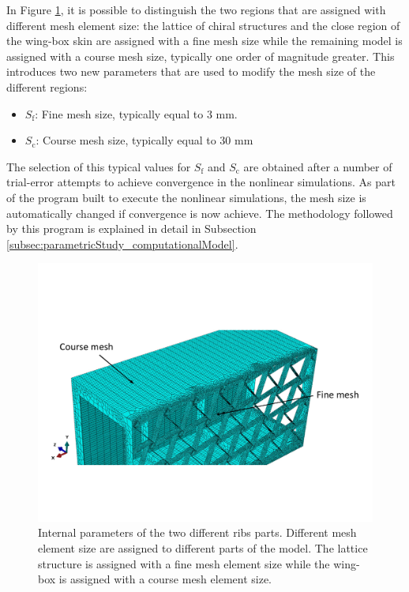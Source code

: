    In Figure \ref{fig:mesh}, it is possible to distinguish the two regions that are assigned with different mesh element size: the lattice of chiral structures and the close region of the wing-box skin are assigned with a fine mesh size while the remaining model is assigned with a course mesh size, typically one order of magnitude greater. This introduces two new parameters that are used to modify the mesh size of the different regions:
    \begin{itemize}
      \item $S_{\mathrm{f}}$: Fine mesh size, typically equal to 3 mm.
      \item $S_{\mathrm{c}}$: Course mesh size, typically equal to 30 mm
    \end{itemize}

    The selection of this typical values for $S_{\mathrm{f}}$ and $S_{\mathrm{c}}$ are obtained after a number of trial-error attempts to achieve convergence in the nonlinear simulations. As part of the program built to execute the nonlinear simulations, the mesh size is automatically changed if convergence is now achieve. The methodology followed by this program is explained in detail in Subsection \ref{subsec:parametricStudy_computationalModel}.

    \begin{figure}[!htpb]
      \centering
      \includegraphics[width=0.8 \textwidth]{figures/model/mesh}
      \caption[Internal parameters of the two different ribs parts]{Internal parameters of the two different ribs parts. Different mesh element size are assigned to different parts of the model. The lattice structure is assigned with a fine mesh element size while the wing-box is assigned with a course mesh element size.}\label{fig:mesh}
    \end{figure}

